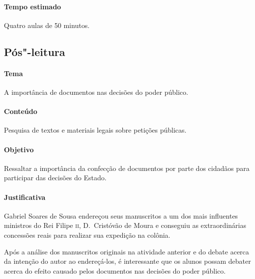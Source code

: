 \documentclass[12pt]{extarticle}
\begin{document}
\paragraph{Tempo estimado} Quatro aulas de 50 minutos.



\subsection{Pós"-leitura}


\paragraph{Tema} A importância de documentos nas decisões do poder público.

\paragraph{Conteúdo} Pesquisa de textos e materiais legais sobre petições públicas.

\paragraph{Objetivo} Ressaltar a importância da confecção de documentos por parte
dos cidadãos para participar das decisões do Estado.

\paragraph{Justificativa} Gabriel Soares de Sousa endereçou seus manuscritos 
a um dos mais influentes ministros do Rei Filipe
\textsc{ii}, D.~Cristóvão de Moura e conseguiu as
extraordinárias concessões reais para realizar sua expedição na
colônia.

Após a análise dos manuscritos originais na atividade anterior e do 
debate acerca da intenção do autor ao endereçá-los, é interessante que os alunos possam debater acerca do
efeito causado pelos documentos nas decisões do poder público.
\end{document}
